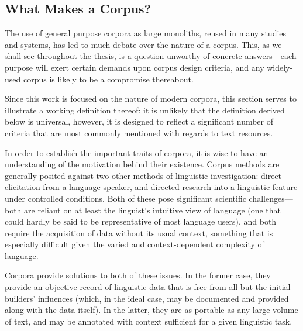 \subsection{What Makes a Corpus?} %
The use of general purpose corpora as large monoliths, reused in many studies and systems, has led to much debate over the nature of a corpus.  This, as we shall see throughout the thesis, is a question unworthy of concrete answers---each purpose will exert certain demands upon corpus design criteria, and any widely-used corpus is likely to be a compromise thereabout.

Since this work is focused on the nature of modern corpora, this section serves to illustrate a working definition thereof: it is unlikely that the definition derived below is universal, however, it is designed to reflect a significant number of criteria that are most commonly mentioned with regards to text resources.




In order to establish the important traits of corpora, it is wise to have an understanding of the motivation behind their existence.  Corpus methods are generally posited against two other methods of linguistic investigation: direct elicitation from a language speaker, and directed research into a linguistic feature under controlled conditions.  Both of these pose significant scientific challenges---both are reliant on at least the linguist's intuitive view of language (one that could hardly be said to be representative of most language users), and both require the acquisition of data without its usual context, something that is especially difficult given the varied and context-dependent complexity of language.

Corpora provide solutions to both of these issues.  In the former case, they provide an objective record of linguistic data that is free from all but the initial builders' influences (which, in the ideal case, may be documented and provided along with the data itself).  In the latter, they are as portable as any large volume of text, and may be annotated with context sufficient for a given linguistic task.


\paragraph{}

